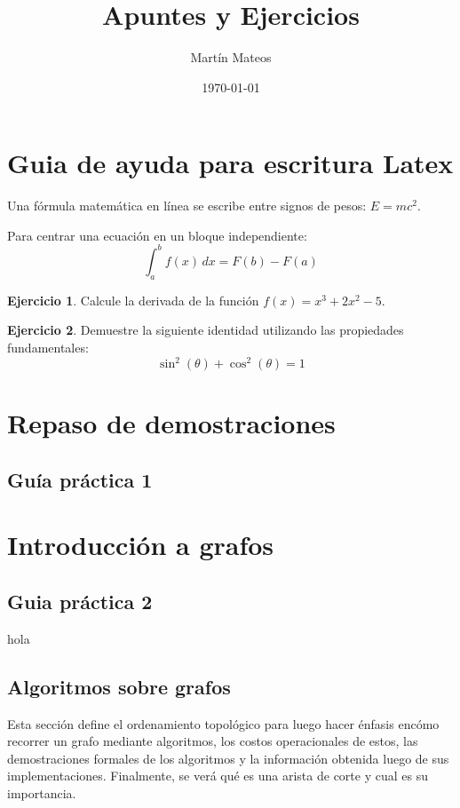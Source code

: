 \documentclass[12pt]{article}
\title{Apuntes y Ejercicios}
\author{Martín Mateos}
\date{\today}
\theoremstyle{definition}
\newtheorem{ejercicio}{Ejercicio}
\begin{document}
\maketitle
\tableofcontents
\newpage
\section{Guia de ayuda para escritura Latex}

Una fórmula matemática en línea se escribe entre signos de pesos: $E = mc^2$. 

Para centrar una ecuación en un bloque independiente:
\[
\int_{a}^{b} f(x) \, dx = F(b) - F(a)
\]



\begin{ejercicio}
Calcule la derivada de la función $f(x) = x^3 + 2x^2 - 5$.
\end{ejercicio}

\begin{ejercicio}
Demuestre la siguiente identidad utilizando las propiedades fundamentales:
\begin{equation}
\sin^2(\theta) + \cos^2(\theta) = 1
\end{equation}
\end{ejercicio}

\section{Repaso de demostraciones}

\subsection{Guía práctica 1}
\section{Introducción a grafos}

\subsection{Guia práctica 2}
hola
\subsection{Algoritmos sobre grafos}
Esta sección define el ordenamiento topológico para luego hacer énfasis encómo recorrer un grafo mediante 
algoritmos, los costos operacionales de estos, las demostraciones formales de los algoritmos y la información
obtenida luego de sus implementaciones. Finalmente,
se verá qué es una arista de corte y cual es su importancia.
\end{document}
